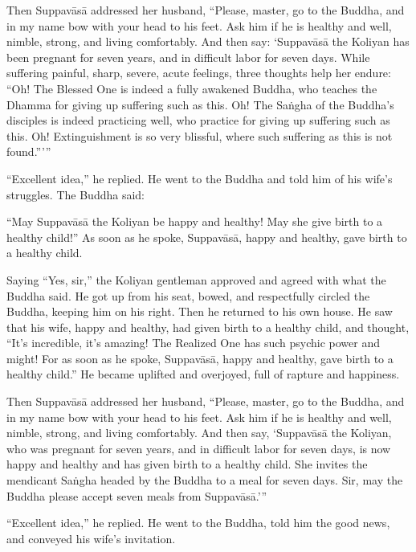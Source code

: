 \documentclass[12pt,openany]{book}%
\begin{document}
Then \textsanskrit{Suppavāsā} addressed her husband, “Please, master, go to the Buddha, and in my name bow with your head to his feet. Ask him if he is healthy and well, nimble, strong, and living comfortably. And then say: ‘\textsanskrit{Suppavāsā} the Koliyan has been pregnant for seven years, and in difficult labor for seven days. While suffering painful, sharp, severe, acute feelings, three thoughts help her endure: “Oh! The Blessed One is indeed a fully awakened Buddha, who teaches the Dhamma for giving up suffering such as this. Oh! The \textsanskrit{Saṅgha} of the Buddha’s disciples is indeed practicing well, who practice for giving up suffering such as this. Oh! Extinguishment is so very blissful, where such suffering as this is not found.”’” 

“Excellent idea,” he replied. He went to the Buddha and told him of his wife’s struggles. The Buddha said: 

“May \textsanskrit{Suppavāsā} the Koliyan be happy and healthy! May she give birth to a healthy child!” As soon as he spoke, \textsanskrit{Suppavāsā}, happy and healthy, gave birth to a healthy child. 

Saying “Yes, sir,” the Koliyan gentleman approved and agreed with what the Buddha said. He got up from his seat, bowed, and respectfully circled the Buddha, keeping him on his right. Then he returned to his own house. He saw that his wife, happy and healthy, had given birth to a healthy child, and thought, “It’s incredible, it’s amazing! The Realized One has such psychic power and might! For as soon as he spoke, \textsanskrit{Suppavāsā}, happy and healthy, gave birth to a healthy child.” He became uplifted and overjoyed, full of rapture and happiness. 

Then \textsanskrit{Suppavāsā} addressed her husband, “Please, master, go to the Buddha, and in my name bow with your head to his feet. Ask him if he is healthy and well, nimble, strong, and living comfortably. And then say, ‘\textsanskrit{Suppavāsā} the Koliyan, who was pregnant for seven years, and in difficult labor for seven days, is now happy and healthy and has given birth to a healthy child. She invites the mendicant \textsanskrit{Saṅgha} headed by the Buddha to a meal for seven days. Sir, may the Buddha please accept seven meals from \textsanskrit{Suppavāsā}.’” 

“Excellent idea,” he replied. He went to the Buddha, told him the good news, and conveyed his wife’s invitation. 
\end{document}
